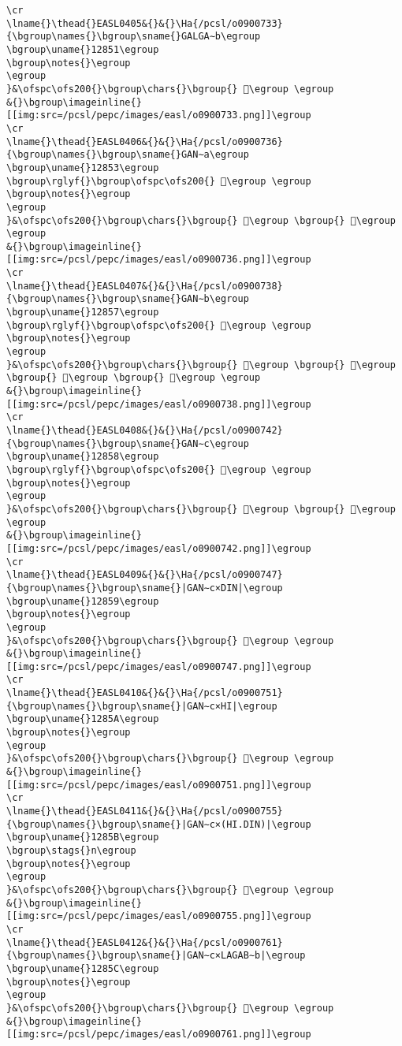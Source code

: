 \begin{verbatim}
\cr
\lname{}\thead{}EASL0405&{}&{}\Ha{/pcsl/o0900733}{\bgroup\names{}\bgroup\sname{}GALGA∼b\egroup
\bgroup\uname{}12851\egroup
\bgroup\notes{}\egroup
\egroup
}&\ofspc\ofs200{}\bgroup\chars{}\bgroup{} 𒡑\egroup \egroup
&{}\bgroup\imageinline{}[[img:src=/pcsl/pepc/images/easl/o0900733.png]]\egroup
\cr
\lname{}\thead{}EASL0406&{}&{}\Ha{/pcsl/o0900736}{\bgroup\names{}\bgroup\sname{}GAN∼a\egroup
\bgroup\uname{}12853\egroup
\bgroup\rglyf{}\bgroup\ofspc\ofs200{} 𒡓\egroup \egroup
\bgroup\notes{}\egroup
\egroup
}&\ofspc\ofs200{}\bgroup\chars{}\bgroup{} 𒡒\egroup \bgroup{} 𒡓\egroup \egroup
&{}\bgroup\imageinline{}[[img:src=/pcsl/pepc/images/easl/o0900736.png]]\egroup
\cr
\lname{}\thead{}EASL0407&{}&{}\Ha{/pcsl/o0900738}{\bgroup\names{}\bgroup\sname{}GAN∼b\egroup
\bgroup\uname{}12857\egroup
\bgroup\rglyf{}\bgroup\ofspc\ofs200{} 𒡗\egroup \egroup
\bgroup\notes{}\egroup
\egroup
}&\ofspc\ofs200{}\bgroup\chars{}\bgroup{} 𒡔\egroup \bgroup{} 𒡕\egroup \bgroup{} 𒡖\egroup \bgroup{} 𒡗\egroup \egroup
&{}\bgroup\imageinline{}[[img:src=/pcsl/pepc/images/easl/o0900738.png]]\egroup
\cr
\lname{}\thead{}EASL0408&{}&{}\Ha{/pcsl/o0900742}{\bgroup\names{}\bgroup\sname{}GAN∼c\egroup
\bgroup\uname{}12858\egroup
\bgroup\rglyf{}\bgroup\ofspc\ofs200{} 𒡘\egroup \egroup
\bgroup\notes{}\egroup
\egroup
}&\ofspc\ofs200{}\bgroup\chars{}\bgroup{} 𒡘\egroup \bgroup{} 𒡠\egroup \egroup
&{}\bgroup\imageinline{}[[img:src=/pcsl/pepc/images/easl/o0900742.png]]\egroup
\cr
\lname{}\thead{}EASL0409&{}&{}\Ha{/pcsl/o0900747}{\bgroup\names{}\bgroup\sname{}|GAN∼c×DIN|\egroup
\bgroup\uname{}12859\egroup
\bgroup\notes{}\egroup
\egroup
}&\ofspc\ofs200{}\bgroup\chars{}\bgroup{} 𒡙\egroup \egroup
&{}\bgroup\imageinline{}[[img:src=/pcsl/pepc/images/easl/o0900747.png]]\egroup
\cr
\lname{}\thead{}EASL0410&{}&{}\Ha{/pcsl/o0900751}{\bgroup\names{}\bgroup\sname{}|GAN∼c×HI|\egroup
\bgroup\uname{}1285A\egroup
\bgroup\notes{}\egroup
\egroup
}&\ofspc\ofs200{}\bgroup\chars{}\bgroup{} 𒡚\egroup \egroup
&{}\bgroup\imageinline{}[[img:src=/pcsl/pepc/images/easl/o0900751.png]]\egroup
\cr
\lname{}\thead{}EASL0411&{}&{}\Ha{/pcsl/o0900755}{\bgroup\names{}\bgroup\sname{}|GAN∼c×(HI.DIN)|\egroup
\bgroup\uname{}1285B\egroup
\bgroup\stags{}n\egroup
\bgroup\notes{}\egroup
\egroup
}&\ofspc\ofs200{}\bgroup\chars{}\bgroup{} 𒡛\egroup \egroup
&{}\bgroup\imageinline{}[[img:src=/pcsl/pepc/images/easl/o0900755.png]]\egroup
\cr
\lname{}\thead{}EASL0412&{}&{}\Ha{/pcsl/o0900761}{\bgroup\names{}\bgroup\sname{}|GAN∼c×LAGAB∼b|\egroup
\bgroup\uname{}1285C\egroup
\bgroup\notes{}\egroup
\egroup
}&\ofspc\ofs200{}\bgroup\chars{}\bgroup{} 𒡜\egroup \egroup
&{}\bgroup\imageinline{}[[img:src=/pcsl/pepc/images/easl/o0900761.png]]\egroup

\end{verbatim}
